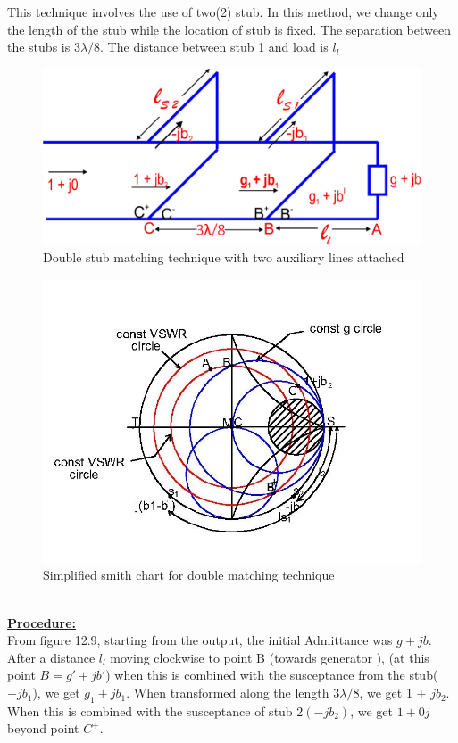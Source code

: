 This technique involves the use of two(2) stub. In this method, we change only the length of the stub while the location of stub is fixed. The separation between the stubs is $ 3\lambda/8$. The distance between stub 1 and load is $l_l$%
\begin{figure}[h]
\centering
\includegraphics[width=1\linewidth]{./graphics/fig12}
\caption{Double stub matching technique with two auxiliary lines attached}
\end{figure}
\begin{figure}[h]
\centering
\includegraphics[width=1\linewidth]{./graphics/dousmith}
\caption{Simplified smith chart for double matching technique}
\end{figure}\\
\underline{\textbf{Procedure:} } \\

From figure 12.9, starting from the output, the initial Admittance was $g + jb$. After a distance $l_l$ moving clockwise to point B (towards generator ), (at this point $B = g' + jb'$) when this is combined with the susceptance from the stub($-jb_1$), we get $g_1 +jb_1$. When transformed along the length $3\lambda/8$, we get 1 + $jb_2$. When this is combined with the susceptance of stub 2$(-jb_2)$, we get $1 + 0j$ beyond point $C^+$.\\

